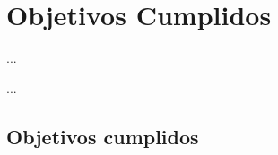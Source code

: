 \chapter{Objetivos Cumplidos}

\begin{FraseCelebre}
\begin{Frase}
...
\end{Frase}
\begin{Fuente}
...
\end{Fuente}
\end{FraseCelebre}


\section{Objetivos cumplidos}
\label{cap33:sec:cumplidos}





